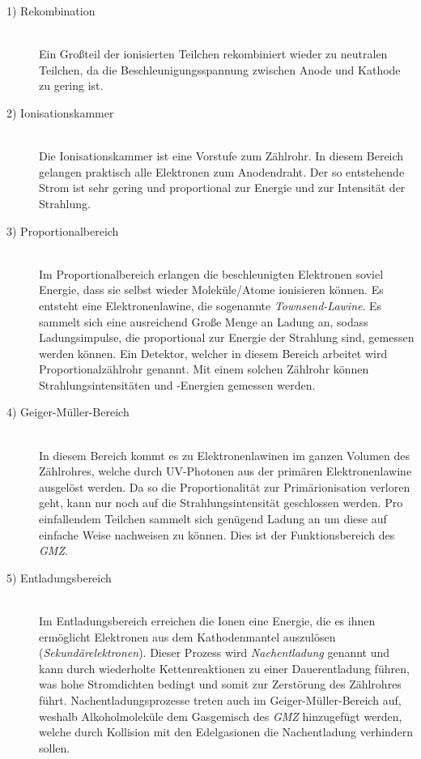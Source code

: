 \begin{description}
  \item[1) Rekombination]\hfill \\
    Ein Großteil der ionisierten Teilchen rekombiniert wieder zu neutralen Teilchen, da die Beschleunigungsspannung zwischen Anode und Kathode zu gering ist.
  \item[2) Ionisationskammer]\hfill \\
    Die Ionisationskammer ist eine Vorstufe zum Zählrohr. In diesem Bereich gelangen praktisch alle Elektronen zum Anodendraht. Der so entstehende Strom ist 
    sehr gering und proportional zur Energie und zur Intensität der Strahlung.
  \item[3) Proportionalbereich]\hfill \\
    Im Proportionalbereich erlangen die beschleunigten Elektronen soviel Energie, dass sie selbst wieder Moleküle/Atome ionisieren können. Es entsteht eine
    Elektronenlawine, die sogenannte \textit{Townsend-Lawine}. Es sammelt sich eine ausreichend Große Menge an Ladung an, sodass Ladungsimpulse, die proportional
    zur Energie der Strahlung sind, gemessen werden können. Ein Detektor, welcher in diesem Bereich arbeitet wird Proportionalzählrohr genannt. Mit einem solchen
    Zählrohr können Strahlungsintensitäten und -Energien gemessen werden.
  \item[4) Geiger-Müller-Bereich]\hfill \\   
    In diesem Bereich kommt es zu Elektronenlawinen im ganzen Volumen des Zählrohres, welche durch UV-Photonen aus der primären Elektronenlawine ausgelöst werden. 
    Da so die Proportionalität zur Primärionisation verloren geht, kann nur noch auf die Strahlungsintensität geschlossen werden. Pro einfallendem Teilchen sammelt 
    sich genügend Ladung an um diese auf einfache Weise nachweisen zu können. Dies ist der Funktionsbereich des \textit{GMZ}.
  \item[5) Entladungsbereich]\hfill \\
    Im Entladungsbereich erreichen die Ionen eine Energie, die es ihnen ermöglicht Elektronen aus dem Kathodenmantel auszulösen (\textit{Sekundärelektronen}). 
    Dieser Prozess wird \textit{Nachentladung} genannt und kann durch wiederholte Kettenreaktionen zu einer Dauerentladung führen, was hohe Stromdichten bedingt 
    und somit zur Zerstörung des Zählrohres führt. Nachentladungsprozesse treten auch im Geiger-Müller-Bereich auf, weshalb Alkoholmoleküle dem Gasgemisch 
    des \textit{GMZ} hinzugefügt werden, welche durch Kollision mit den Edelgasionen die Nachentladung verhindern sollen.
\end{description}

